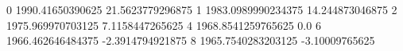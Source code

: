 0 1990.41650390625 21.5623779296875
1 1983.0989990234375 14.244873046875
2 1975.969970703125 7.1158447265625
4 1968.8541259765625 0.0
6 1966.462646484375 -2.3914794921875
8 1965.7540283203125 -3.10009765625
